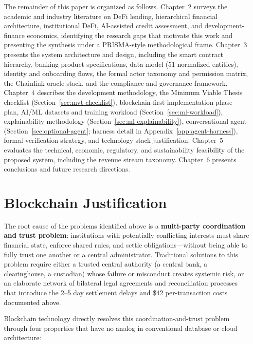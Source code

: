\documentclass[12pt,a4paper]{report}
\begin{document}
The remainder of this paper is organized as follows. Chapter~2 surveys the academic and industry literature on DeFi lending, hierarchical financial architecture, institutional DeFi, AI-assisted credit assessment, and development-finance economics, identifying the research gaps that motivate this work and presenting the synthesis under a PRISMA-style methodological frame. Chapter~3 presents the system architecture and design, including the smart contract hierarchy, banking product specifications, data model (51 normalized entities), identity and onboarding flows, the formal actor taxonomy and permission matrix, the Chainlink oracle stack, and the compliance and governance framework. Chapter~4 describes the development methodology, the Minimum Viable Thesis checklist (Section~\ref{sec:mvt-checklist}), blockchain-first implementation phase plan, AI/ML datasets and training workload (Section~\ref{sec:ml-workload}), explainability methodology (Section~\ref{sec:ml-explainability}), conversational agent (Section~\ref{sec:optional-agent}; harness detail in Appendix~\ref{app:agent-harness}), formal-verification strategy, and technology stack justification. Chapter~5 evaluates the technical, economic, regulatory, and sustainability feasibility of the proposed system, including the revenue stream taxonomy. Chapter~6 presents conclusions and future research directions.

\section{Blockchain Justification}

The root cause of the problems identified above is a \textbf{multi-party coordination and trust problem}: institutions with potentially conflicting interests must share financial state, enforce shared rules, and settle obligations---without being able to fully trust one another or a central administrator. Traditional solutions to this problem require either a trusted central authority (a central bank, a clearinghouse, a custodian) whose failure or misconduct creates systemic risk, or an elaborate network of bilateral legal agreements and reconciliation processes that introduce the 2--5 day settlement delays and \$42 per-transaction costs documented above.

Blockchain technology directly resolves this coordination-and-trust problem through four properties that have no analog in conventional database or cloud architecture:
\end{document}
